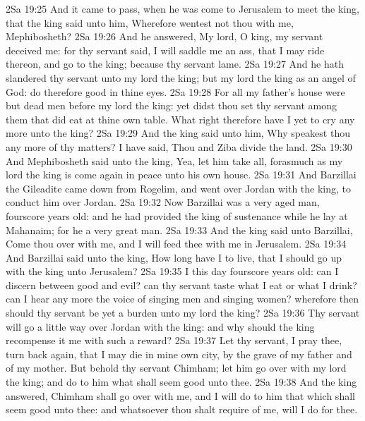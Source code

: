 \vs 2Sa 19:25 And it came to pass, when he was come to Jerusalem to meet the king, that the king said unto him, Wherefore wentest not thou with me, Mephibosheth?
\vs 2Sa 19:26 And he answered, My lord, O king, my servant deceived me: for thy servant said, I will saddle me an ass, that I may ride thereon, and go to the king; because thy servant  lame.
\vs 2Sa 19:27 And he hath slandered thy servant unto my lord the king; but my lord the king  as an angel of God: do therefore  good in thine eyes.
\vs 2Sa 19:28 For all  my father's house were but dead men before my lord the king: yet didst thou set thy servant among them that did eat at thine own table. What right therefore have I yet to cry any more unto the king?
\vs 2Sa 19:29 And the king said unto him, Why speakest thou any more of thy matters? I have said, Thou and Ziba divide the land.
\vs 2Sa 19:30 And Mephibosheth said unto the king, Yea, let him take all, forasmuch as my lord the king is come again in peace unto his own house.
\vs 2Sa 19:31 And Barzillai the Gileadite came down from Rogelim, and went over Jordan with the king, to conduct him over Jordan.
\vs 2Sa 19:32 Now Barzillai was a very aged man,  fourscore years old: and he had provided the king of sustenance while he lay at Mahanaim; for he  a very great man.
\vs 2Sa 19:33 And the king said unto Barzillai, Come thou over with me, and I will feed thee with me in Jerusalem.
\vs 2Sa 19:34 And Barzillai said unto the king, How long have I to live, that I should go up with the king unto Jerusalem?
\vs 2Sa 19:35 I  this day fourscore years old:  can I discern between good and evil? can thy servant taste what I eat or what I drink? can I hear any more the voice of singing men and singing women? wherefore then should thy servant be yet a burden unto my lord the king?
\vs 2Sa 19:36 Thy servant will go a little way over Jordan with the king: and why should the king recompense it me with such a reward?
\vs 2Sa 19:37 Let thy servant, I pray thee, turn back again, that I may die in mine own city,  by the grave of my father and of my mother. But behold thy servant Chimham; let him go over with my lord the king; and do to him what shall seem good unto thee.
\vs 2Sa 19:38 And the king answered, Chimham shall go over with me, and I will do to him that which shall seem good unto thee: and whatsoever thou shalt require of me,  will I do for thee.
